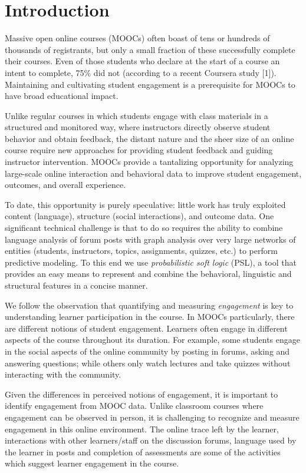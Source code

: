 \section{Introduction}
\label{sec:introduction}

Massive open online courses (MOOCs) often boast of tens or hundreds of thousands of registrants, 
but only a small fraction of these successfully complete their courses. 
Even of those students who declare at the start of a course an intent to complete, 
75\% did not (according to a recent Coursera study [1]). 
Maintaining and cultivating student engagement is a prerequisite for MOOCs to have broad educational impact.   

Unlike regular courses in which students engage with class materials in a structured and monitored way, 
where instructors directly observe student behavior and obtain feedback, the distant nature 
and the sheer size of an online course require new approaches for providing student feedback and guiding instructor intervention.
  MOOCs provide a tantalizing opportunity for analyzing large-scale online interaction
 and behavioral data to improve student engagement, outcomes, and overall experience. 
   
  To date, this opportunity is purely speculative: little work has truly exploited content (language), structure (social interactions),
 and outcome data. One significant technical challenge is that to do so requires the ability to combine language analysis of forum posts 
 with graph analysis over very large networks of entities (students, instructors, topics, assignments, quizzes, etc.) to perform predictive
  modeling. To this end we use \emph{probabilistic soft logic} (PSL), a tool that provides an easy means to represent and combine the behavioral, 
  linguistic and structural features in a concise manner.



We follow the observation that quantifying and measuring \emph{engagement} is key to understanding learner participation in the course. 
In MOOCs particularly, there are different notions of student engagement.
Learners often engage in different aspects of the course throughout its duration. For example, some students engage in the social aspects of the online community by posting in forums, asking and answering questions; while others only watch lectures and take quizzes without interacting with the community.  

Given the differences in perceived notions of engagement, it is important to identify engagement from MOOC data. 
Unlike classroom courses where engagement can be observed in person, it is challenging to recognize and measure engagement in this online environment. 
The online trace left by the learner, interactions with other learners/staff on the discussion forums, 
language used by the learner in posts and completion of assessments are some of the activities which suggest learner engagement in the course. 


